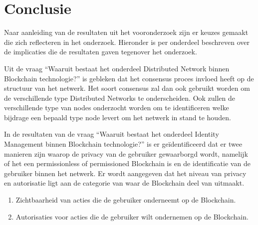 \section{Conclusie}

Naar aanleiding van de resultaten uit het vooronderzoek zijn er keuzes gemaakt die zich reflecteren in het onderzoek. Hieronder is per onderdeel beschreven over de implicaties die de resultaten gaven tegenover het onderzoek. 

Uit de vraag ``Waaruit bestaat het onderdeel Distributed Network binnen Blockchain technologie?'' is gebleken dat het consensus proces invloed heeft op de structuur van het netwerk. Het soort consensus zal dan ook gebruikt worden om de verschillende type Distributed Networks te onderscheiden. Ook zullen de verschillende type van nodes onderzocht worden om te identificeren welke bijdrage een bepaald type node levert om het netwerk in stand te houden. 

In de resultaten van de vraag ``Waaruit bestaat het onderdeel Identity Management binnen Blockchain technologie?'' is er geïdentificeerd dat er twee manieren zijn waarop de privacy van de gebruiker gewaarborgd wordt, namelijk of het een permissionless of permissioned Blockchain is en de identificatie van de gebruiker binnen het netwerk. Er wordt aangegeven dat het niveau van privacy en autorisatie ligt aan de categorie van waar de Blockchain deel van uitmaakt.

\begin{enumerate}[noitemsep]
  \item Zichtbaarheid van acties die de gebruiker onderneemt op de Blockchain.
  \item Autorisaties voor acties die de gebruiker wilt ondernemen op de Blockchain.
\end{enumerate}
